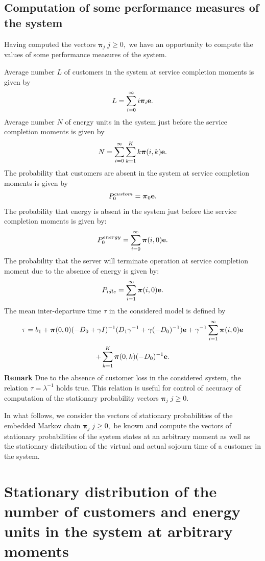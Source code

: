 \documentclass[12pt, a4paper]{article}
\begin{document}
\subsection{Computation of some performance measures of the system}

Having computed the vectors ${\boldsymbol \pi}_{j}\; j \ge 0,$  we have an opportunity to compute the values of some performance measures of the system.

Average number $L$ of customers in the system at service completion moments is given by
$$
L = \sum\limits_{i = 0}^{\infty} i {\boldsymbol \pi}_i {\bf e}.
$$
Average number $N$ of energy units in the system just before the service completion moments is given by
$$
N =\sum\limits_{i = 0}^{\infty} \sum\limits_{k = 1}^{K} k {\boldsymbol \pi}(i,k){\bf e}.
$$
The probability that customers are absent in the system at service completion moments is given by
$$
P_0^{custom} = {\boldsymbol \pi}_0 {\bf e}.
$$
The probability that energy is absent in the system just before the service completion moments is given by:
$$
P_0^{energy} = \sum\limits_{i = 0}^{\infty} {\boldsymbol \pi}(i,0){\bf e}.
$$
The probability that the server will terminate operation at service completion moment due to the absence of energy is given by:
$$
P_{idle} = \sum\limits_{i = 1}^{\infty} {\boldsymbol \pi}(i,0){\bf e}.
$$
The mean inter-departure time $\tau$ in the considered model is defined by
$$
\tau=b_1+{\boldsymbol \pi}(0,0)(-D_0+\gamma I)^{-1}(D_1\gamma^{-1}+ \gamma (-D_0)^{-1}){\bf e}+\gamma^{-1} \sum\limits_{i=1}^{\infty} {\boldsymbol \pi}(i,0){\bf e}$$$$+\sum\limits_{k=1}^{K} {\boldsymbol \pi}(0,k)(-D_0)^{-1}{\bf e}.
$$
 {\bf Remark}
Due to the absence of customer loss in the considered system, the relation $\tau=\lambda^{-1}$ holds true. This relation is useful for control of accuracy of computation of the
stationary probability vectors ${\boldsymbol \pi}_{j}\; j \ge 0.$



In what follows, we consider the vectors of stationary probabilities of the embedded Markov chain ${\boldsymbol \pi}_{j}\; j \ge 0,$ be known and compute the vectors of stationary probabilities of the system states at an arbitrary moment as well as the stationary distribution of the virtual and actual sojourn time of a customer in the system.


\section{Stationary distribution of the number of customers and energy units in the system at arbitrary moments}
\end{document}
